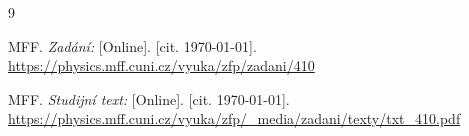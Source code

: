 
\begin{thebibliography}{9}

 MFF. \emph{Zadání:} [Online]. [cit. \today]. \newline \url{https://physics.mff.cuni.cz/vyuka/zfp/zadani/410}

 MFF. \emph{Studijní text:} [Online]. [cit. \today]. \newline \url{https://physics.mff.cuni.cz/vyuka/zfp/_media/zadani/texty/txt_410.pdf}

\end{thebibliography}
